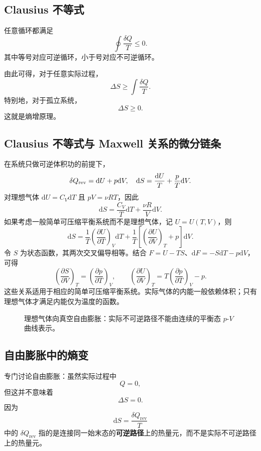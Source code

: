 \documentclass[11pt,a4paper,openany]{ctexbook}
\newcommand{\dd}{\mathrm d}
\newcommand{\rev}{\mathrm{rev}}
\begin{document}
\subsection*{Clausius 不等式}
任意循环都满足
\[
\boxed{\oint \frac{\delta Q}{T}\le0}.
\]
其中等号对应可逆循环，小于号对应不可逆循环。

由此可得，对于任意实际过程，
\[
\Delta S\ge \int \frac{\delta Q}{T}.
\]
特别地，对于孤立系统，
\[
\boxed{\Delta S\ge0}.
\]
这就是熵增原理。


\subsection*{Clausius 不等式与 Maxwell 关系的微分链条}
在系统只做可逆体积功的前提下，
\[
\delta Q_{\rm rev}=\dd U+p\dd V,\quad
\dd S=\frac{\dd U}{T}+\frac pT\dd V.
\]
对理想气体 $\dd U=C_V\dd T$ 且 $pV=\nu RT$，因此
\[
\dd S=\frac{C_V}{T}\dd T+\frac{\nu R}{V}\dd V.
\]
如果考虑一般简单可压缩平衡系统而不是理想气体，记 $U=U(T,V)$，则
\[
\dd S=\frac1T\left(\frac{\partial U}{\partial T}\right)_V\dd T
+\frac1T\left[\left(\frac{\partial U}{\partial V}\right)_T+p\right]\dd V.
\]
令 $S$ 为状态函数，其两次交叉偏导相等。结合
$F=U-TS$、$\dd F=-S\dd T-p\dd V$，
可得
\[
\boxed{\left(\frac{\partial S}{\partial V}\right)_T
=\left(\frac{\partial p}{\partial T}\right)_V},\qquad
\boxed{\left(\frac{\partial U}{\partial V}\right)_T
=T\left(\frac{\partial p}{\partial T}\right)_V-p}.
\]
这些关系适用于相应的简单可压缩平衡系统。实际气体的内能一般依赖体积；只有理想气体才满足内能仅为温度的函数。



\begin{figure}[htbp]\centering
{}
\caption{理想气体向真空自由膨胀：实际不可逆路径不能由连续的平衡态 $p$-$V$ 曲线表示。}
\end{figure}

\subsection*{自由膨胀中的熵变}
专门讨论自由膨胀：虽然实际过程中
\[
Q=0,
\]
但这并不意味着
\[
\Delta S=0.
\]
因为
\[
\dd S=\frac{\delta Q_{\rev}}{T}
\]
中的 $\delta Q_{\rev}$ 指的是连接同一始末态的\textbf{可逆路径}上的热量元，而不是实际不可逆路径上的热量元。
\end{document}
